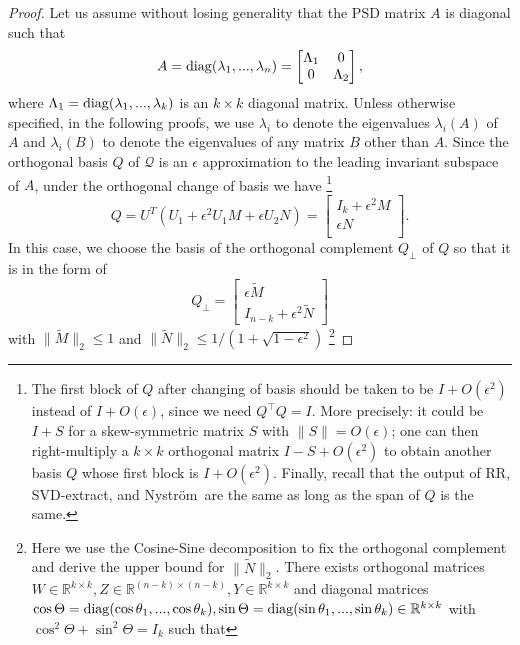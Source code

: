 \documentclass[onefignum,onetabnum]{siamart251216}
\def\subspace{\mathcal{Q}}
\def\Nystrom{Nystr{\"o}m}
\def\svdmethod{SVD-extract}
\def\realR{\mathbb{R}}
\newcommand{\diag}{{\rm diag}}
\begin{document}
\begin{proof}
Let us assume without losing generality that the PSD matrix $A$ is diagonal such that
\[
    A
    =
    \diag (\lambda_{1}, ..., \lambda_{n})
    =
    \begin{bmatrix}
        \Lambda_{1} & 0 \\
        0 & \Lambda_{2} \\
    \end{bmatrix},
\]
where $\Lambda_{1} = \diag(\lambda_1, ..., \lambda_k)$ is an $k \times k$ diagonal matrix. Unless otherwise specified, in the following proofs, we use $\lambda_i$ to denote the eigenvalues $\lambda_i(A)$ of $A$ and $\lambda_i(B)$ to denote the eigenvalues of any matrix $B$ other than $A$. Since the orthogonal basis $Q$ of $\subspace$ is an $\epsilon$ approximation to the leading invariant subspace of $A$, under the orthogonal change of basis we have \footnote{The first block of $Q$ after changing of basis should be taken to be $I + O(\epsilon^2)$ instead of $I + O(\epsilon)$, since we need $Q^\top Q = I$. More precisely: it could be $I+S$ for a skew-symmetric matrix $S$ with $\|S\|=O(\epsilon)$; one can then right-multiply a $k\times k$ orthogonal matrix $I-S+O(\epsilon^2)$ to obtain another basis $Q$ whose first block is $I + O(\epsilon^2)$. Finally, recall that the output of RR, \svdmethod, and \Nystrom\ are the same as long as the span of $Q$ is the same.
}
\begin{equation}
    \label{eq:transformed-Q-block-form}
    Q = U^T (U_1 + \epsilon^2 U_1 M + \epsilon U_2 N) =
    \begin{bmatrix}
        I_k + \epsilon^2 M \\
        \epsilon N \\
    \end{bmatrix}.
\end{equation}
In this case, we choose the basis of the orthogonal complement $Q_{\perp}$ of $Q$ so that it is in the form of
\[
    Q_{\perp} =
    \begin{bmatrix}
        \epsilon \widetilde{M} \\
        I_{n-k} + \epsilon^2 \widetilde{N}
    \end{bmatrix}
\]
with $\|\widetilde{M}\|_2 \leq 1$ and $\|\widetilde{N}\|_2 \leq 1 / (1 + \sqrt{1 - \epsilon^2})$ \footnote{Here we use the Cosine-Sine decomposition \cite{stewart1977perturbation} to fix the orthogonal complement and derive the upper bound for $\|\widetilde{N}\|_2$. There exists orthogonal matrices $W \in \realR^{k \times k}, Z \in \realR^{(n-k) \times (n-k)}, Y \in \realR^{k \times k}$ and diagonal matrices $\cos \Theta = \diag(\cos \theta_1, ..., \cos \theta_k), \sin \Theta = \diag(\sin \theta_1, ..., \sin \theta_k) \in \realR^{k \times k}$ with $\cos^2 \Theta + \sin^2 \Theta = I_k$ such that
}
\end{proof}
\end{document}
